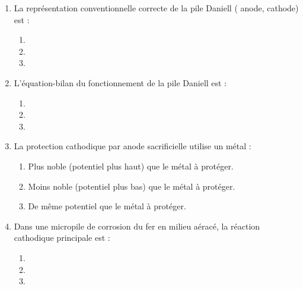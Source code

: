 \documentclass[11pt]{article}
\begin{document}
\begin{exercice}
\begin{enumerate}
    \item La représentation conventionnelle correcte de la pile Daniell ( anode,  cathode) est :
    \begin{enumerate}
        \item {}
        \item {}
        \item {}
    \end{enumerate}
    \item L'équation-bilan du fonctionnement de la pile Daniell est :
    \begin{enumerate}
        \item {}
        \item {}
        \item {}
    \end{enumerate}
    \item La protection cathodique par anode sacrificielle utilise un métal :
    \begin{enumerate}
        \item Plus noble (potentiel plus haut) que le métal à protéger.
        \item Moins noble (potentiel plus bas) que le métal à protéger.
        \item De même potentiel que le métal à protéger.
    \end{enumerate}
    \item Dans une micropile de corrosion du fer en milieu aéracé, la réaction cathodique principale est :
    \begin{enumerate}
        \item {}
        \item {}
        \item {}
    \end{enumerate}
\end{enumerate}
\end{exercice}
\end{document}

